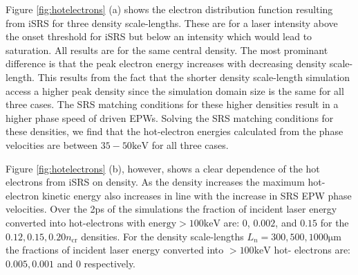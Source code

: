 Figure \ref{fig:hotelectrons} (a) shows the
electron distribution function resulting from iSRS for three density scale-lengths. These are for a laser intensity
above the onset threshold for iSRS but below an intensity which would lead to saturation. All results are
for the same central density. The most prominant difference is that the peak electron energy increases with
decreasing density scale-length. This results from the fact that the shorter density scale-length simulation
access a higher peak density since the simulation domain size is the same for all three cases. The SRS
matching conditions for these higher densities result in a higher phase speed of driven EPWs. Solving the
SRS matching conditions for these densities, we find that the hot-electron energies calculated from the phase
velocities are between $35 - 50 \si{\kilo \electronvolt}$ for all three cases.


Figure \ref{fig:hotelectrons} (b), however, shows a clear dependence of the hot
electrons from iSRS on density. As the density increases the maximum hot-
electron kinetic energy also increases in line with the increase in SRS EPW
phase velocities.
Over the 2ps of the simulations the fraction of incident laser energy converted
into hot-electrons with $\mathrm{energy} > 100\si{\kilo \electronvolt}$ are: 0,
$0.002$, and $0.15$ for the $0.12,0.15,0.20 n_\mathrm{cr}$ densities. For the
density scale-lengths $L_n=300,500,1000\si{\micro\metre}$ the fractions of
incident laser energy converted into $> 100\si{\kilo \electronvolt}$ hot-
electrons are: $0.005,0.001$ and $0$ respectively.

